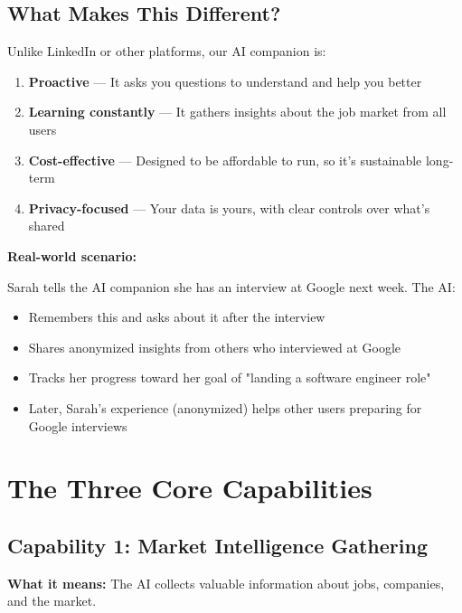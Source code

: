 \documentclass[12pt,a4paper]{article}
\begin{document}
\subsection{What Makes This Different?}

Unlike LinkedIn or other platforms, our AI companion is:

\begin{enumerate}[leftmargin=*]
  \item \textbf{Proactive} — It asks you questions to understand and help you better
  \item \textbf{Learning constantly} — It gathers insights about the job market from all users
  \item \textbf{Cost-effective} — Designed to be affordable to run, so it's sustainable long-term
  \item \textbf{Privacy-focused} — Your data is yours, with clear controls over what's shared
\end{enumerate}

\begin{example}
\textbf{Real-world scenario:}

Sarah tells the AI companion she has an interview at Google next week. The AI:
\begin{itemize}
  \item Remembers this and asks about it after the interview
  \item Shares anonymized insights from others who interviewed at Google
  \item Tracks her progress toward her goal of "landing a software engineer role"
  \item Later, Sarah's experience (anonymized) helps other users preparing for Google interviews
\end{itemize}
\end{example}

\section{The Three Core Capabilities}

\subsection{Capability 1: Market Intelligence Gathering}

\textbf{What it means:} The AI collects valuable information about jobs, companies, and the market.
\end{document}
